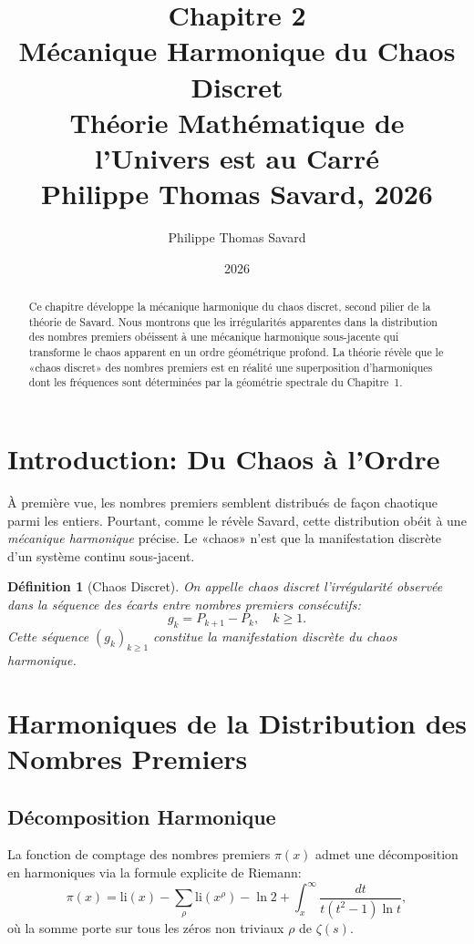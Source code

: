 \documentclass[12pt,a4paper]{article}
\title{%
  \textbf{Chapitre 2}\\[0.5em]
  \Large Mécanique Harmonique du Chaos Discret\\[0.5em]
  \large Théorie Mathématique de l'Univers est au Carré\\[0.5em]
  \normalsize Philippe Thomas Savard, 2026
}
\author{Philippe Thomas Savard}
\date{2026}
\newtheorem{definition}{Définition}
\begin{document}
\maketitle
\tableofcontents
\newpage

\begin{abstract}
Ce chapitre développe la mécanique harmonique du chaos discret, second pilier de la
théorie de Savard. Nous montrons que les irrégularités apparentes dans la distribution
des nombres premiers obéissent à une mécanique harmonique sous-jacente qui transforme
le chaos apparent en un ordre géométrique profond. La théorie révèle que le «chaos
discret» des nombres premiers est en réalité une superposition d'harmoniques dont
les fréquences sont déterminées par la géométrie spectrale du Chapitre~1.
\end{abstract}

\section{Introduction: Du Chaos à l'Ordre}

À première vue, les nombres premiers semblent distribués de façon chaotique parmi
les entiers. Pourtant, comme le révèle Savard, cette distribution obéit à une
\emph{mécanique harmonique} précise. Le «chaos» n'est que la manifestation discrète
d'un système continu sous-jacent.

\begin{definition}[Chaos Discret]
On appelle \emph{chaos discret} l'irrégularité observée dans la séquence des écarts
entre nombres premiers consécutifs:
\[
  g_k = P_{k+1} - P_k, \quad k \geq 1.
\]
Cette séquence $(g_k)_{k \geq 1}$ constitue la manifestation discrète du chaos harmonique.
\end{definition}

\section{Harmoniques de la Distribution des Nombres Premiers}

\subsection{Décomposition Harmonique}

La fonction de comptage des nombres premiers $\pi(x)$ admet une décomposition en
harmoniques via la formule explicite de Riemann:
\[
  \pi(x) = \mathrm{li}(x) - \sum_{\rho} \mathrm{li}(x^\rho) - \ln 2 +
  \int_x^{\infty} \frac{dt}{t(t^2-1)\ln t},
\]
où la somme porte sur tous les zéros non triviaux $\rho$ de $\zeta(s)$.
\end{document}
